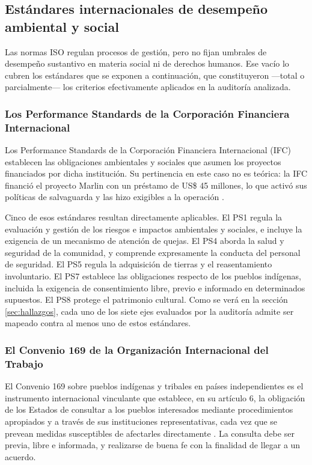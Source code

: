 \subsection{Estándares internacionales de desempeño ambiental y social}

Las normas ISO regulan procesos de gestión, pero no fijan umbrales de desempeño
sustantivo en materia social ni de derechos humanos. Ese vacío lo cubren los
estándares que se exponen a continuación, que constituyeron —total o
parcialmente— los criterios efectivamente aplicados en la auditoría analizada.

\subsubsection{Los Performance Standards de la Corporación Financiera Internacional}

Los Performance Standards de la Corporación Financiera Internacional (IFC)
establecen las obligaciones ambientales y sociales que asumen los proyectos
financiados por dicha institución. Su pertinencia en este caso no es teórica: la
IFC financió el proyecto Marlin con un préstamo de US\$ 45 millones, lo que activó
sus políticas de salvaguarda y las hizo exigibles a la operación
\parencite{ifcsfmarlin, cao2006marlin}.

Cinco de esos estándares resultan directamente aplicables. El PS1 regula la
evaluación y gestión de los riesgos e impactos ambientales y sociales, e incluye
la exigencia de un mecanismo de atención de quejas. El PS4 aborda la salud y
seguridad de la comunidad, y comprende expresamente la conducta del personal de
seguridad. El PS5 regula la adquisición de tierras y el reasentamiento
involuntario. El PS7 establece las obligaciones respecto de los pueblos indígenas,
incluida la exigencia de consentimiento libre, previo e informado en determinados
supuestos. El PS8 protege el patrimonio cultural. Como se verá en la sección
\ref{sec:hallazgos}, cada uno de los siete ejes evaluados por la auditoría admite
ser mapeado contra al menos uno de estos estándares.

\subsubsection{El Convenio 169 de la Organización Internacional del Trabajo}

El Convenio 169 sobre pueblos indígenas y tribales en países independientes es el
instrumento internacional vinculante que establece, en su artículo 6, la
obligación de los Estados de consultar a los pueblos interesados mediante
procedimientos apropiados y a través de sus instituciones representativas, cada
vez que se prevean medidas susceptibles de afectarles directamente
\parencite{oit1989convenio169}. La consulta debe ser previa, libre e informada, y
realizarse de buena fe con la finalidad de llegar a un acuerdo.


